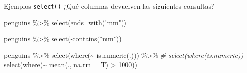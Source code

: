 \documentclass[
  ignorenonframetext,
  aspectratio=169]{beamer}
\newenvironment{Shaded}{\begin{snugshade}}{\end{snugshade}}
\newcommand{\AttributeTok}[1]{\textcolor[rgb]{0.77,0.63,0.00}{#1}}
\newcommand{\CommentTok}[1]{\textcolor[rgb]{0.56,0.35,0.01}{\textit{#1}}}
\newcommand{\DecValTok}[1]{\textcolor[rgb]{0.00,0.00,0.81}{#1}}
\newcommand{\FunctionTok}[1]{\textcolor[rgb]{0.00,0.00,0.00}{#1}}
\newcommand{\NormalTok}[1]{#1}
\newcommand{\SpecialCharTok}[1]{\textcolor[rgb]{0.00,0.00,0.00}{#1}}
\newcommand{\StringTok}[1]{\textcolor[rgb]{0.31,0.60,0.02}{#1}}
\begin{document}
\begin{frame}[fragile]{Ejemplos \texttt{select()}}
\protect\hypertarget{ejemplos-select-7}{}
¿Qué columnas devuelven las siguientes consultas?

\begin{Shaded}
\begin{Highlighting}[]
\NormalTok{penguins }\SpecialCharTok{\%\textgreater{}\%} 
  \FunctionTok{select}\NormalTok{(}\FunctionTok{ends\_with}\NormalTok{(}\StringTok{"mm"}\NormalTok{))}
\end{Highlighting}
\end{Shaded}

\begin{Shaded}
\begin{Highlighting}[]
\NormalTok{penguins }\SpecialCharTok{\%\textgreater{}\%} 
  \FunctionTok{select}\NormalTok{(}\SpecialCharTok{{-}}\FunctionTok{contains}\NormalTok{(}\StringTok{"mm"}\NormalTok{))}
\end{Highlighting}
\end{Shaded}

\begin{Shaded}
\begin{Highlighting}[]
\NormalTok{penguins }\SpecialCharTok{\%\textgreater{}\%} 
  \FunctionTok{select}\NormalTok{(}\FunctionTok{where}\NormalTok{(}\SpecialCharTok{\textasciitilde{}} \FunctionTok{is.numeric}\NormalTok{(.))) }\SpecialCharTok{\%\textgreater{}\%}  \CommentTok{\# select(where(is.numeric))}
  \FunctionTok{select}\NormalTok{(}\FunctionTok{where}\NormalTok{(}\SpecialCharTok{\textasciitilde{}} \FunctionTok{mean}\NormalTok{(., }\AttributeTok{na.rm =}\NormalTok{ T) }\SpecialCharTok{\textgreater{}} \DecValTok{1000}\NormalTok{))}
\end{Highlighting}
\end{Shaded}
\end{frame}
\end{document}
